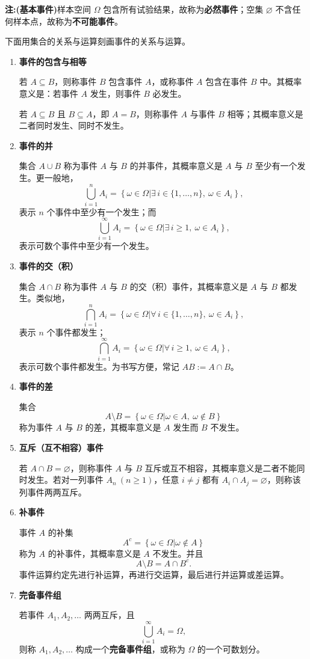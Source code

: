 \textbf{注:(基本事件)}样本空间 $\Omega$ 包含所有试验结果，故称为\textbf{必然事件}；空集 $\varnothing$ 不含任何样本点，故称为\textbf{不可能事件}。

下面用集合的关系与运算刻画事件的关系与运算。

\begin{enumerate}
\item \textbf{事件的包含与相等}

若 $A\subseteq B$，则称事件 $B$ 包含事件 $A$，或称事件 $A$ 包含在事件 $B$ 中。其概率意义是：若事件 $A$ 发生，则事件 $B$ 必发生。

若 $A\subseteq B$ 且 $B\subseteq A$，即 $A=B$，则称事件 $A$ 与事件 $B$ 相等；其概率意义是二者同时发生、同时不发生。

\item \textbf{事件的并}

集合 $A\cup B$ 称为事件 $A$ 与 $B$ 的并事件，其概率意义是 $A$ 与 $B$ 至少有一个发生。更一般地，
\[
\bigcup_{i=1}^{n} A_i
=\left\{\omega\in\Omega\mathrel{\big|}\exists\, i\in\{1,\ldots,n\},\ \omega\in A_i\right\},
\]
表示 $n$ 个事件中至少有一个发生；而
\[
\bigcup_{i=1}^{\infty} A_i
=\left\{\omega\in\Omega\mathrel{\big|}\exists\, i\geq 1,\ \omega\in A_i\right\},
\]
表示可数个事件中至少有一个发生。

\item \textbf{事件的交（积）}

集合 $A\cap B$ 称为事件 $A$ 与 $B$ 的交（积）事件，其概率意义是 $A$ 与 $B$ 都发生。类似地，
\[
\bigcap_{i=1}^{n} A_i
=\left\{\omega\in\Omega\mathrel{\big|}\forall\, i\in\{1,\ldots,n\},\ \omega\in A_i\right\},
\]
表示 $n$ 个事件都发生；
\[
\bigcap_{i=1}^{\infty} A_i
=\left\{\omega\in\Omega\mathrel{\big|}\forall\, i\geq 1,\ \omega\in A_i\right\},
\]
表示可数个事件都发生。为书写方便，常记 $AB:=A\cap B$。

\item \textbf{事件的差}

集合
\[
A\setminus B=\left\{\omega\in\Omega\mathrel{\big|}\omega\in A,\ \omega\notin B\right\}
\]
称为事件 $A$ 与 $B$ 的差，其概率意义是 $A$ 发生而 $B$ 不发生。

\item \textbf{互斥（互不相容）事件}

若 $A\cap B=\varnothing$，则称事件 $A$ 与 $B$ 互斥或互不相容，其概率意义是二者不能同时发生。若对一列事件 $A_n\ (n\geq1)$，任意 $i\ne j$ 都有 $A_i\cap A_j=\varnothing$，则称该列事件两两互斥。

\item \textbf{补事件}

事件 $A$ 的补集
\[
A^c=\left\{\omega\in\Omega\mathrel{\big|}\omega\notin A\right\}
\]
称为 $A$ 的补事件，其概率意义是 $A$ 不发生。并且
\[
A\setminus B=A\cap B^c.
\]
事件运算约定先进行补运算，再进行交运算，最后进行并运算或差运算。

\item \textbf{完备事件组}

若事件 $A_1,A_2,\ldots$ 两两互斥，且
\[
\bigcup_{i=1}^{\infty}A_i=\Omega,
\]
则称 $A_1,A_2,\ldots$ 构成一个\textbf{完备事件组}，或称为 $\Omega$ 的一个可数划分。
\end{enumerate}

